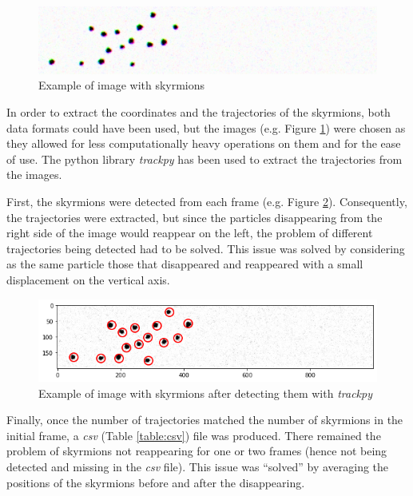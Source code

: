 \documentclass[a4paper]{article}
\begin{document}
  \begin{figure}[h]
    \centering
    \includegraphics[width=\textwidth]{m000198}
    \caption{Example of image with skyrmions}
    \label{fig:m000198}
  \end{figure}

  In order to extract the coordinates and the trajectories of the skyrmions, both data formats could have been used, but the images (e.g. Figure \ref{fig:m000198}) were chosen as they allowed for less computationally heavy operations on them and for the ease of use. The python library \textit{trackpy} has been used to extract the trajectories from the images.

  First, the skyrmions were detected from each frame (e.g. Figure \ref{fig:m000198_detect}). Consequently, the trajectories were extracted, but since the particles disappearing from the right side of the image would reappear on the left, the problem of different trajectories being detected had to be solved. This issue was solved by considering as the same particle those that disappeared and reappeared with a small displacement on the vertical axis.

  \begin{figure}[h]
    \centering
    \includegraphics[width=\textwidth]{m000198_detect}
    \caption{Example of image with skyrmions after detecting them with \textit{trackpy}}
    \label{fig:m000198_detect}
  \end{figure}

  Finally, once the number of trajectories matched the number of skyrmions in the initial frame, a \textit{csv} (Table \ref{table:csv}) file was produced. There remained the problem of skyrmions not reappearing for one or two frames (hence not being detected and missing in the \textit{csv} file). This issue was ``solved'' by averaging the positions of the skyrmions before and after the disappearing.
\end{document}
